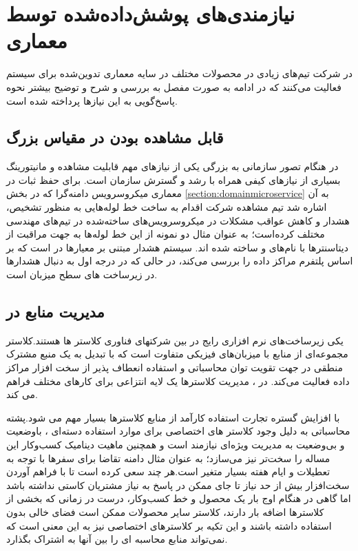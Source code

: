 \section{نیازمندی‌های پوشش‌داده‌شده توسط معماری}
در شرکت  تیم‌های زیادی در محصولات مختلف در سایه معماری تدوین‌شده برای سیستم فعالیت می‌کنند که در ادامه به صورت مفصل به بررسی و شرح و توضیح بیشتر نحوه پاسخ‌گویی به این نیاز‌ها پرداخته شده است.
\subsection{قابل مشاهده بودن در مقیاس بزرگ} 
در هنگام تصور سازمانی به بزرگی  یکی از نیاز‌های مهم قابلیت مشاهده و مانیتورینگ بسیاری از نیاز‌های کیفی همراه با رشد و گسترش سازمان است. برای حفظ ثبات در معماری میکروسرویس دامنه‌گرا که در بخش \ref{section:domainmicroservice} به آن اشاره شد تیم مشاهده شرکت  اقدام به ساخت خط لوله‌هایی به منظور تشخیص، هشدار و کاهش عواقب مشکلات در میکروسرویس‌های ساخته‌شده در تیم‌های مهندسی مختلف کرده‌است؛ به عنوان مثال دو نمونه از این خط لوله‌ها به جهت مراقبت از دیتاسنتر‌ها با نام‌های  و  ساخته شده اند. سیستم هشدار مبتنی بر معیار‌ها در  است که بر اساس پلتفرم  \cite{m3_uber} مراکز داده را بررسی می‌کند، در حالی که  در درجه اول به دنبال هشدارها در زیرساخت های سطح میزبان است.

\subsection{مدیریت منابع در }
یکی زیرساخت‌های نرم افزاری رایج در بین شرکتهای فناوری کلاستر ها هستند.کلاستر مجموعه‌ای از منابع با میزبان‌های فیزیکی متفاوت است که با تبدیل به یک منبع مشترک منطقی در جهت تقویت توان محاسباتی و استفاده انعطاف پذیر از سخت افزار مراکز داده فعالیت می‌کند. در ، مدیریت کلاسترها یک لایه انتزاعی برای کارهای مختلف فراهم می کند\cite{resource_uber}.

با افزایش گستره تجارت  استفاده کارآمد از منابع کلاستر‌ها بسیار مهم می شود.پشته محاسباتی  به دلیل وجود کلاستر های اختصاصی برای موارد استفاده دسته‌ای ، باوضعیت و بی‌وضعیت به مدیریت ویژه‌ای نیازمند است و همچنین ماهیت دینامیک کسب‌و‌کار  این مساله را سخت‌تر نیز می‌سازد؛ به عنوان مثال دامنه تقاضا برای سفرها با توجه به تعطیلات و ایام هفته بسیار متغیر است.هر چند  سعی کرده است تا با فراهم آوردن سخت‌افزار بیش از حد نیاز تا جای ممکن در پاسخ به نیاز مشتریان کاستی نداشته باشد اما گاهی در هنگام اوج بار یک محصول و خط کسب‌و‌کار، درست در زمانی که بخشی از کلاستر‌ها اضافه بار دارند، کلاستر سایر محصولات ممکن است فضای خالی بدون استفاده داشته باشند و این تکیه بر کلاستر‌های اختصاصی نیز به این معنی است که  نمی‌تواند منابع محاسبه ای را بین آنها به اشتراک بگذارد.



